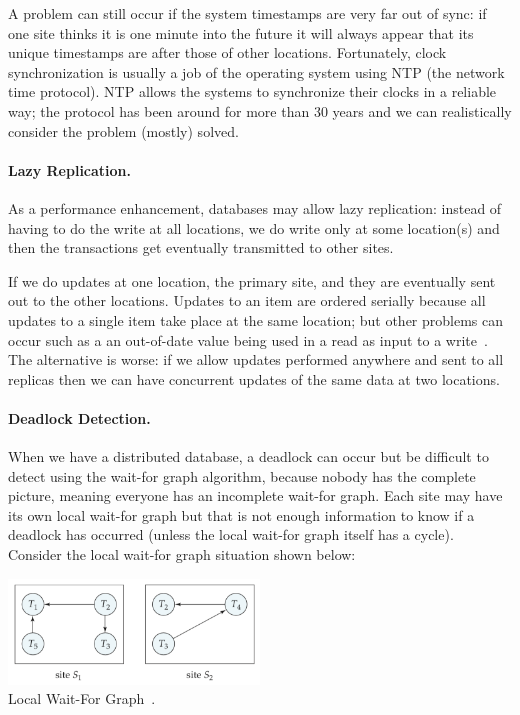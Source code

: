 A problem can still occur if the system timestamps are very far out of sync: if one site thinks it is one minute into the future it will always appear that its unique timestamps are after those of other locations. Fortunately, clock synchronization is usually a job of the operating system using NTP (the network time protocol). NTP allows the systems to synchronize their clocks in a reliable way; the protocol has been around for more than 30 years and we can realistically consider the problem (mostly) solved.

\paragraph{Lazy Replication.} As a performance enhancement, databases may allow lazy replication: instead of having to do the write at all locations, we do write only at some location(s) and then the transactions get eventually transmitted to other sites.

If we do updates at one location, the primary site, and they are eventually sent out to the other locations. Updates to an item are ordered serially because all updates to a single item take place at the same location; but other problems can occur such as a an out-of-date value being used in a read as input to a write~\cite{dsc}. The alternative is worse: if we allow updates performed anywhere and sent to all replicas then we can have concurrent updates of the same data at two locations.

\paragraph{Deadlock Detection.}

When we have a distributed database, a deadlock can occur but be difficult to detect using the wait-for graph algorithm, because nobody has the complete picture, meaning everyone has an incomplete wait-for graph. Each site may have its own local wait-for graph but that is not enough information to know if a deadlock has occurred (unless the local wait-for graph itself has a cycle). Consider the local wait-for graph situation shown below:

\begin{center}
\includegraphics[width=0.5\textwidth]{images/waitfor-local}\\
Local Wait-For Graph~\cite{dsc}.
\end{center}


